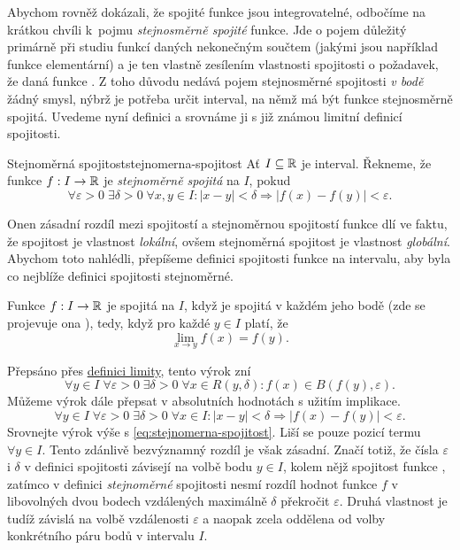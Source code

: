 Abychom rovněž dokázali, že spojité funkce jsou integrovatelné, odbočíme na
krátkou chvíli k~pojmu \emph{stejnosměrně spojité} funkce. Jde o pojem důležitý
primárně při studiu funkcí daných nekonečným součtem (jakými jsou například
funkce elementární) a je ten vlastně zesílením vlastnosti spojitosti o
požadavek, že daná funkce . Z toho důvodu nedává
pojem stejnosměrné spojitosti \emph{v bodě} žádný smysl, nýbrž je potřeba určit
interval, na němž má být funkce stejnosměrně spojitá. Uvedeme nyní definici a
srovnáme ji s již známou limitní definicí spojitosti.

\begin{definition}{Stejnoměrná spojitost}{stejnomerna-spojitost}
 Ať $I \subseteq \mathbb{R}$ je interval. Řekneme, že funkce $f:I \to \mathbb{R}$ je
 \emph{stejnoměrně spojitá} na $I$, pokud
 \begin{equation}
  \label{eq:stejnomerna-spojitost}
  \forall \varepsilon>0 \; \exists \delta>0 \; \forall x,y \in I :|x-y|<\delta
  \Rightarrow |f(x) - f(y)|<\varepsilon.
 \end{equation}
\end{definition}

Onen zásadní rozdíl mezi spojitostí a stejnoměrnou spojitostí funkce dlí ve
faktu, že spojitost je vlastnost \emph{lokální}, ovšem stejnoměrná spojitost je
vlastnost \emph{globální}. Abychom toto nahlédli, přepíšeme definici spojitosti
funkce na intervalu, aby byla co nejblíže definici spojitosti stejnoměrné.

Funkce $f:I \to \mathbb{R}$ je spojitá na $I$, když je spojitá v každém jeho bodě (zde
se projevuje ona ), tedy, když pro každé $y \in I$ platí, že
\[
 \lim_{x \to y} f(x) = f(y).
\]

Přepsáno přes \hyperref[def:limita-funkce]{definici limity}, tento výrok zní
\[
 \forall y \in I \; \forall \varepsilon>0 \; \exists \delta>0 \; \forall x \in
 R(y,\delta) : f(x) \in B(f(y),\varepsilon).
\]
Můžeme výrok dále přepsat v absolutních hodnotách s užitím implikace.
\[
 \forall y \in I \; \forall \varepsilon>0 \; \exists \delta>0 \; \forall x \in I
 : |x - y| < \delta \Rightarrow |f(x) - f(y)| < \varepsilon.
\]
Srovnejte výrok výše s \eqref{eq:stejnomerna-spojitost}. Liší se pouze pozicí
termu $ \forall y \in I$. Tento zdánlivě bezvýznamný rozdíl je však zásadní.
Značí totiž, že čísla $\varepsilon$ i $\delta$ v definici spojitosti závisejí na
volbě bodu $y \in I$, kolem nějž spojitost funkce , zatímco v
definici \emph{stejnoměrné} spojitosti nesmí rozdíl hodnot funkce $f$ v
libovolných dvou bodech vzdálených maximálně $\delta$ překročit $\varepsilon$.
Druhá vlastnost je tudíž závislá na volbě vzdálenosti $\varepsilon$ a naopak
zcela oddělena od volby konkrétního páru bodů v intervalu $I$.

